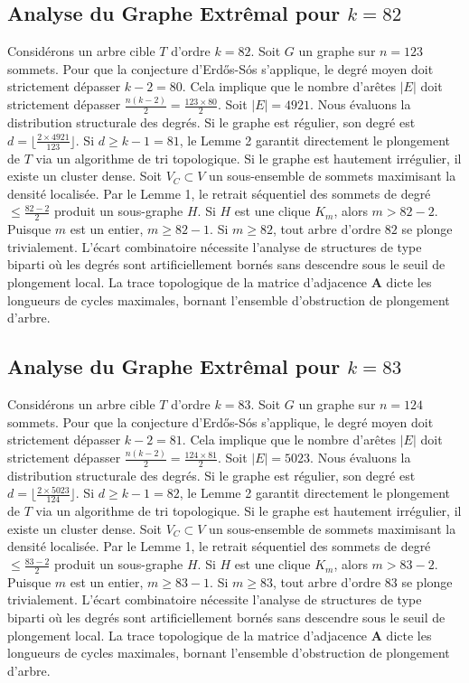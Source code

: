 \documentclass[11pt,a4paper]{article}
\begin{document}
\subsection{Analyse du Graphe Extr\^emal pour $k=82$}
Consid\'erons un arbre cible $T$ d'ordre $k=82$.
Soit $G$ un graphe sur $n=123$ sommets.
Pour que la conjecture d'Erd\H{o}s-S\'os s'applique, le degr\'e moyen doit strictement d\'epasser $k-2 = 80$.
Cela implique que le nombre d'ar\^etes $|E|$ doit strictement d\'epasser $\frac{n(k-2)}{2} = \frac{123 \times 80}{2}$.
Soit $|E| = 4921$.
Nous \'evaluons la distribution structurale des degr\'es. Si le graphe est r\'egulier, son degr\'e est $d = \lfloor \frac{2 \times 4921}{123} \rfloor$.
Si $d \geq k-1 = 81$, le Lemme 2 garantit directement le plongement de $T$ via un algorithme de tri topologique.
Si le graphe est hautement irr\'egulier, il existe un cluster dense. Soit $V_C \subset V$ un sous-ensemble de sommets maximisant la densit\'e localis\'ee.
Par le Lemme 1, le retrait s\'equentiel des sommets de degr\'e $\leq \frac{82-2}{2}$ produit un sous-graphe $H$.
Si $H$ est une clique $K_{m}$, alors $m > 82-2$. Puisque $m$ est un entier, $m \geq 82-1$. Si $m \geq 82$, tout arbre d'ordre $82$ se plonge trivialement.
L'\'ecart combinatoire n\'ecessite l'analyse de structures de type biparti o\`u les degr\'es sont artificiellement born\'es sans descendre sous le seuil de plongement local. La trace topologique de la matrice d'adjacence $\mathbf{A}$ dicte les longueurs de cycles maximales, bornant l'ensemble d'obstruction de plongement d'arbre.


\subsection{Analyse du Graphe Extr\^emal pour $k=83$}
Consid\'erons un arbre cible $T$ d'ordre $k=83$.
Soit $G$ un graphe sur $n=124$ sommets.
Pour que la conjecture d'Erd\H{o}s-S\'os s'applique, le degr\'e moyen doit strictement d\'epasser $k-2 = 81$.
Cela implique que le nombre d'ar\^etes $|E|$ doit strictement d\'epasser $\frac{n(k-2)}{2} = \frac{124 \times 81}{2}$.
Soit $|E| = 5023$.
Nous \'evaluons la distribution structurale des degr\'es. Si le graphe est r\'egulier, son degr\'e est $d = \lfloor \frac{2 \times 5023}{124} \rfloor$.
Si $d \geq k-1 = 82$, le Lemme 2 garantit directement le plongement de $T$ via un algorithme de tri topologique.
Si le graphe est hautement irr\'egulier, il existe un cluster dense. Soit $V_C \subset V$ un sous-ensemble de sommets maximisant la densit\'e localis\'ee.
Par le Lemme 1, le retrait s\'equentiel des sommets de degr\'e $\leq \frac{83-2}{2}$ produit un sous-graphe $H$.
Si $H$ est une clique $K_{m}$, alors $m > 83-2$. Puisque $m$ est un entier, $m \geq 83-1$. Si $m \geq 83$, tout arbre d'ordre $83$ se plonge trivialement.
L'\'ecart combinatoire n\'ecessite l'analyse de structures de type biparti o\`u les degr\'es sont artificiellement born\'es sans descendre sous le seuil de plongement local. La trace topologique de la matrice d'adjacence $\mathbf{A}$ dicte les longueurs de cycles maximales, bornant l'ensemble d'obstruction de plongement d'arbre.
\end{document}
